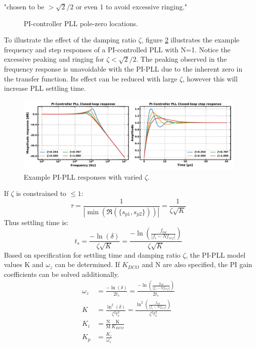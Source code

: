 			"chosen to be $>\sqrt{2}/2$ or even 1 to avoid excessive ringing."
			\begin{figure}[htb!]
				\center
				\caption{PI-controller PLL pole-zero locations.}
				\label{fig:pi_pll_pz}
			\end{figure}
			\FloatBarrier
			To illustrate the effect of the damping ratio $\zeta$, figure \ref{fig:pi_pll_response} illustrates the example frequency and step responses of a PI-controlled PLL with N=1. Notice the excessive peaking and ringing for $\zeta<\sqrt{2}/2$. The peaking observed in the frequency response is unavoidable with the PI-PLL due to the inherent zero in the transfer function. Its effect can be reduced with large $\zeta$, however this will increase PLL settling time. 
			\begin{figure}[htb!]
				\center\includegraphics[width=1.0\textwidth, angle=0]{figs/pi_pll_response.pdf}
				\caption{Example PI-PLL responses with varied $\zeta$.}
				\label{fig:pi_pll_response}
			\end{figure}
			\FloatBarrier
			If $\zeta$ is constrained to $\leq 1$:
			\begin{equation}
				\tau = \frac{1}{|\min(\Re(\{s_{p1}, s_{p2}\}))|} = \frac{1}{\zeta\sqrt{K}}
			\end{equation}
			Thus settling time is:
			\begin{equation}
				t_s = \frac{-\ln(\delta)}{\zeta\sqrt{K}} = \frac{-\ln\left(\frac{f_{tol}}{|f_i - Nf_{ref}|}\right)}{\zeta\sqrt{K}} 
			\end{equation}
			Based on specification for settling time and damping ratio $\zeta$, the PI-PLL model values K and $\omega_z$ can be determined. If $K_{DCO}$ and $\mathrm{N}$ are also specified, the PI gain coefficients can be solved additionally.
			\begin{align}
				\omega_z &= \frac{-\ln(\delta)}{2t_s} =  \frac{-\ln\left(\frac{f_{tol}}{|f_i - Nf_{ref}|}\right)}{2t_s}\label{eq:omega_z_pi}\\
				K &= \frac{\ln^2(\delta)}{\zeta^2t_s^2} =  \frac{\ln^2\left(\frac{f_{tol}}{|f_i - Nf_{ref}|}\right)}{\zeta^2t_s^2}\\
				K_i & = \frac{\mathrm{N}}{\mathrm{M}}\frac{\mathrm{K}}{K_{DCO}} \\
				K_p & = \frac{K_i}{\omega_z}\label{eq:kp_pi}
			\end{align}
